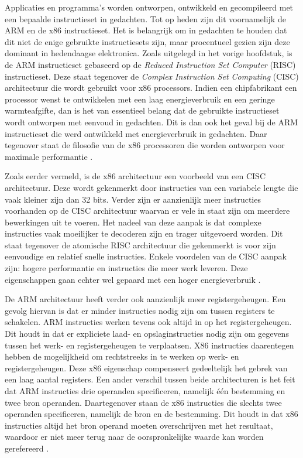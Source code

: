 Applicaties en programma’s worden ontworpen, ontwikkeld en gecompileerd met een bepaalde instructieset in gedachten. Tot op heden zijn dit voornamelijk de ARM en de x86 instructieset. Het is belangrijk om in gedachten te houden dat dit niet de enige gebruikte instructiesets zijn, maar procentueel gezien zijn deze dominant in hedendaagse elektronica. Zoals uitgelegd in het vorige hoofdstuk, is de ARM instructieset gebaseerd op de \textit{Reduced Instruction Set Computer} (RISC) instructieset. Deze staat tegenover de \textit{Complex Instruction Set Computing} (CISC) architectuur die wordt gebruikt voor x86 processors. Indien een chipfabrikant een processor wenst te ontwikkelen met een laag energieverbruik en een geringe warmteafgifte, dan is het van essentieel belang dat de gebruikte instructieset wordt ontworpen met eenvoud in gedachten. Dit is dan ook het geval bij de ARM instructieset die werd ontwikkeld met energieverbruik in gedachten. Daar tegenover staat de filosofie van de x86 processoren die worden ontworpen voor maximale performantie \autocite{Triggs2022}.

Zoals eerder vermeld, is de x86 architectuur een voorbeeld van een CISC architectuur. Deze wordt gekenmerkt door instructies van een variabele lengte die vaak kleiner zijn dan 32 bits. Verder zijn er aanzienlijk meer instructies voorhanden op de CISC architectuur waarvan er vele in staat zijn om meerdere bewerkingen uit te voeren. Het nadeel van deze aanpak is dat complexe instructies vaak moeilijker te decoderen zijn en trager uitgevoerd worden. Dit staat tegenover de atomische RISC architectuur die gekenmerkt is voor zijn eenvoudige en relatief snelle instructies. Enkele voordelen van de CISC aanpak zijn: hogere performantie en instructies die meer werk leveren. Deze eigenschappen gaan echter wel gepaard met een hoger energieverbruik \autocite{SarahHarris2015}. 

De ARM architectuur heeft verder ook aanzienlijk meer registergeheugen. Een gevolg hiervan is dat er minder instructies nodig zijn om tussen registers te schakelen. ARM instructies werken tevens ook altijd in op het registergeheugen. Dit houdt in dat er expliciete laad- en opslaginstructies nodig zijn om gegevens tussen het werk- en registergeheugen te verplaatsen. X86 instructies daarentegen hebben de mogelijkheid om rechtstreeks in te werken op werk- en registergeheugen. Deze x86 eigenschap compenseert gedeeltelijk het gebrek van een laag aantal registers. Een ander verschil tussen beide architecturen is het feit dat ARM instructies drie operanden specificeren, namelijk één bestemming en twee bron operanden. Daartegenover staan de x86 instructies die slechts twee operanden specificeren, namelijk de bron en de bestemming. Dit houdt in dat x86 instructies altijd het bron operand moeten overschrijven met het resultaat, waardoor er niet meer terug naar de oorspronkelijke waarde kan worden gerefereerd \autocite{SarahHarris2015}. 


